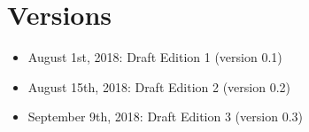 \documentclass[12pt]{book}
\begin{document}
\newpage
\chapter*{Versions}

\noindent
\begin{itemize}
	\item August 1st, 2018: \hspace{2cm} Draft Edition 1 (version 0.1)
	\item August 15th, 2018: \hspace{2cm} Draft Edition 2 (version 0.2)
	\item September 9th, 2018: \hspace{2cm} Draft Edition 3 (version 0.3)
\end{itemize}



\ifx\wholebook\relax\else
% 
% 
	
\end{document}

